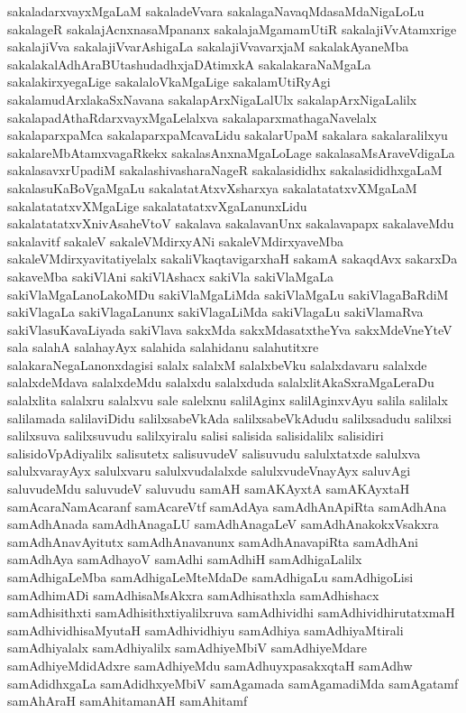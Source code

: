 {sakaladarxvayxMgaLaM
sakaladeVvara
sakalagaNavaqMdasaMdaNigaLoLu
sakalageR
sakalajAcnxnasaMpananx
sakalajaMgamamUtiR
sakalajiVvAtamxrige
sakalajiVva
sakalajiVvarAshigaLa
sakalajiVvavarxjaM
sakalakAyaneMba
sakalakalAdhAraBUtashudadhxjaDAtimxkA
sakalakaraNaMgaLa
sakalakirxyegaLige
sakalaloVkaMgaLige
sakalamUtiRyAgi
sakalamudArxlakaSxNavana
sakalapArxNigaLalUlx
sakalapArxNigaLalilx
sakalapadAthaRdarxvayxMgaLelalxva
sakalaparxmathagaNavelalx
sakalaparxpaMca
sakalaparxpaMcavaLidu
sakalarUpaM
sakalara
sakalaralilxyu
sakalareMbAtamxvagaRkekx
sakalasAnxnaMgaLoLage
sakalasaMsAraveVdigaLa
sakalasavxrUpadiM
sakalashivasharaNageR
sakalasididhx
sakalasididhxgaLaM
sakalasuKaBoVgaMgaLu
sakalatatAtxvXsharxya
sakalatatatxvXMgaLaM
sakalatatatxvXMgaLige
sakalatatatxvXgaLanunxLidu
sakalatatatxvXnivAsaheVtoV
sakalava
sakalavanUnx
sakalavapapx
sakalaveMdu
sakalavitf
sakaleV
sakaleVMdirxyANi
sakaleVMdirxyaveMba
sakaleVMdirxyavitatiyelalx
sakaliVkaqtavigarxhaH
sakamA
sakaqdAvx
sakarxDa
sakaveMba
sakiVlAni
sakiVlAshacx
sakiVla
sakiVlaMgaLa
sakiVlaMgaLanoLakoMDu
sakiVlaMgaLiMda
sakiVlaMgaLu
sakiVlagaBaRdiM
sakiVlagaLa
sakiVlagaLanunx
sakiVlagaLiMda
sakiVlagaLu
sakiVlamaRva
sakiVlasuKavaLiyada
sakiVlava
sakxMda
sakxMdasatxtheYva
sakxMdeVneYteV
sala
salahA
salahayAyx
salahida
salahidanu
salahutitxre
salakaraNegaLanonxdagisi
salalx
salalxM
salalxbeVku
salalxdavaru
salalxde
salalxdeMdava
salalxdeMdu
salalxdu
salalxduda
salalxlitAkaSxraMgaLeraDu
salalxlita
salalxru
salalxvu
sale
salelxnu
salilAginx
salilAginxvAyu
salila
salilalx
salilamada
salilaviDidu
salilxsabeVkAda
salilxsabeVkAdudu
salilxsadudu
salilxsi
salilxsuva
salilxsuvudu
salilxyiralu
salisi
salisida
salisidalilx
salisidiri
salisidoVpAdiyalilx
salisutetx
salisuvudeV
salisuvudu
salulxtatxde
salulxva
salulxvarayAyx
salulxvaru
salulxvudalalxde
salulxvudeVnayAyx
saluvAgi
saluvudeMdu
saluvudeV
saluvudu
samAH
samAKAyxtA
samAKAyxtaH
samAcaraNamAcaranf
samAcareVtf
samAdAya
samAdhAnApiRta
samAdhAna
samAdhAnada
samAdhAnagaLU
samAdhAnagaLeV
samAdhAnakokxVsakxra
samAdhAnavAyitutx
samAdhAnavanunx
samAdhAnavapiRta
samAdhAni
samAdhAya
samAdhayoV
samAdhi
samAdhiH
samAdhigaLalilx
samAdhigaLeMba
samAdhigaLeMteMdaDe
samAdhigaLu
samAdhigoLisi
samAdhimADi
samAdhisaMsAkxra
samAdhisathxla
samAdhishacx
samAdhisithxti
samAdhisithxtiyalilxruva
samAdhividhi
samAdhividhirutatxmaH
samAdhividhisaMyutaH
samAdhividhiyu
samAdhiya
samAdhiyaMtirali
samAdhiyalalx
samAdhiyalilx
samAdhiyeMbiV
samAdhiyeMdare
samAdhiyeMdidAdxre
samAdhiyeMdu
samAdhuyxpasakxqtaH
samAdhw
samAdidhxgaLa
samAdidhxyeMbiV
samAgamada
samAgamadiMda
samAgatamf
samAhAraH
samAhitamanAH
samAhitamf
}
